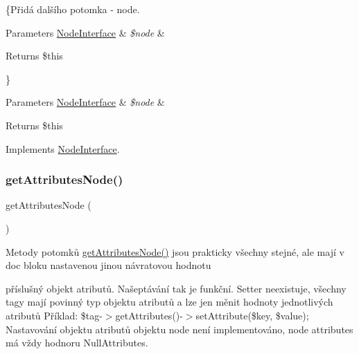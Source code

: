 \{Přidá dalšího potomka -\/ node.


\begin{DoxyParams}[1]{Parameters}
\mbox{\hyperlink{interface_pes_1_1_dom_1_1_node_1_1_node_interface}{Node\+Interface}} & {\em \$node} & \\
\hline
\end{DoxyParams}
\begin{DoxyReturn}{Returns}
\$this
\end{DoxyReturn}
\} 
\begin{DoxyParams}[1]{Parameters}
\mbox{\hyperlink{interface_pes_1_1_dom_1_1_node_1_1_node_interface}{Node\+Interface}} & {\em \$node} & \\
\hline
\end{DoxyParams}
\begin{DoxyReturn}{Returns}
\$this 
\end{DoxyReturn}


Implements \mbox{\hyperlink{interface_pes_1_1_dom_1_1_node_1_1_node_interface_a1d59c3782ba90a94f31ee6c58d86e9fc}{Node\+Interface}}.

\mbox{\label{class_pes_1_1_dom_1_1_node_1_1_node_abstract_a4722e7722b245351681b05d35f6694f3}} 
\subsubsection{\texorpdfstring{get\+Attributes\+Node()}{getAttributesNode()}}
{\footnotesize\ttfamily get\+Attributes\+Node (\begin{DoxyParamCaption}{ }\end{DoxyParamCaption})\hspace{0.3cm}{\ttfamily [abstract]}}

Metody potomků \mbox{\hyperlink{class_pes_1_1_dom_1_1_node_1_1_node_abstract_a4722e7722b245351681b05d35f6694f3}{get\+Attributes\+Node()}} jsou prakticky všechny stejné, ale mají v doc bloku nastavenou jinou návratovou hodnotu
\begin{DoxyItemize}
\item příslušný objekt atributů. Našeptávání tak je funkční. Setter neexistuje, všechny tagy mají povinný typ objektu atributů a lze jen měnit hodnoty jednotlivých atributů Příklad\+: \$tag-\/$>$get\+Attributes()-\/$>$set\+Attribute(\$key, \$value); Nastavování objektu atributů objektu node není implementováno, node attributes má vždy hodnoru Null\+Attributes. 
\end{DoxyItemize}

